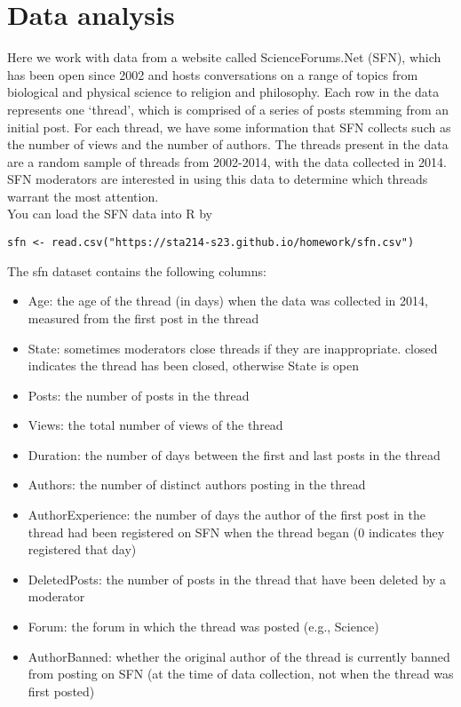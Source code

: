 \documentclass[11pt]{article}
\begin{document}
\vspace{1cm}

\section{Data analysis}

Here we work with data from a website called ScienceForums.Net (SFN), which has been open since 2002 and hosts conversations on a range of topics from biological and physical science to religion and philosophy. Each row in the data represents one ‘thread’, which is comprised of a series of posts stemming from an initial post. For each thread, we have some information that SFN collects such as the number of views and the number of authors. The threads present in the data are a random sample of threads from 2002-2014, with the data collected in 2014. SFN moderators are interested in using this data to determine which threads warrant the most attention.\\

\noindent You can load the SFN data into R by

\begin{verbatim}
sfn <- read.csv("https://sta214-s23.github.io/homework/sfn.csv")
\end{verbatim}

\noindent The sfn dataset contains the following columns:

\begin{itemize}
\item Age: the age of the thread (in days) when the data was collected in 2014, measured from the first post in the thread
\item State: sometimes moderators close threads if they are inappropriate. closed indicates the thread has been closed, otherwise State is open
\item Posts: the number of posts in the thread
\item Views: the total number of views of the thread
\item Duration: the number of days between the first and last posts in the thread
\item Authors: the number of distinct authors posting in the thread
\item AuthorExperience: the number of days the author of the first post in the thread had been registered on SFN when the thread began (0 indicates they registered that day)
\item DeletedPosts: the number of posts in the thread that have been deleted by a moderator
\item Forum: the forum in which the thread was posted (e.g., Science)
\item AuthorBanned: whether the original author of the thread is currently banned from posting on SFN (at the time of data collection, not when the thread was first posted)
\end{itemize}
\end{document}
